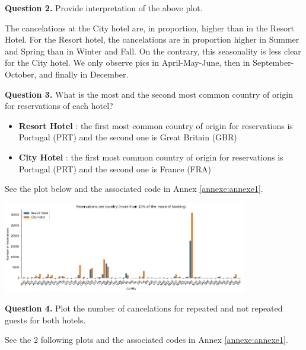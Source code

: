 \documentclass[10pt,a4paper]{article}
\providecommand{\tightlist}{%
  \setlength{\parskip}{0pt}
  }
\theoremstyle{break}
\begin{document}
\begin{tcolorbox}

\textbf{Question 2.} Provide interpretation of the above plot.

\end{tcolorbox}

The cancelations at the City hotel are, in proportion, higher than in the Resort Hotel. For the Resort hotel, the cancelations are in proportion higher in Summer and Spring than in Winter and Fall. On the contrary, this seasonality is less clear for the City hotel. We only observe pics in April-May-June, then in September-October, and finally in December.

\begin{tcolorbox}

\textbf{Question 3.} What is the most and the second most common country of origin for reservations of each hotel?

\end{tcolorbox}

\begin{itemize}
\tightlist
\item
  \textbf{Resort Hotel} : the first most common country of origin for reservations is Portugal (PRT) and the second one is Great Britain (GBR)
\item
  \textbf{City Hotel} : the first most common country of origin for reservations is Portugal (PRT) and the second one is France (FRA)
\end{itemize}

See the plot below and the associated code in Annex \ref{annexe:annexe1}.

\includegraphics[width=0.8\textwidth]{img/TP2_KA_IB_files/TP2_KA_IB_36_1.png}

\begin{tcolorbox}

\textbf{Question 4.} Plot the number of cancelations for repeated and not repeated guests for both hotels.

\end{tcolorbox}

See the 2 following plots and the associated codes in Annex \ref{annexe:annexe1}.
\end{document}
